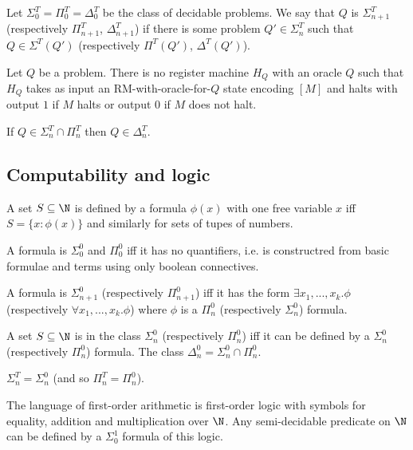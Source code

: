 \documentclass{article}
\begin{document}
\begin{definition}
    Let $\Sigma_0^T=\Pi^T_0=\Delta^T_0$ be the class of decidable problems. We say 
    that $Q$ is $\Sigma_{n+1}^T$ (respectively $\Pi_{n+1}^T$, $\Delta_{n+1}^T$)
    if there is some problem $Q'\in\Sigma_n^T$ such that $Q\in\Sigma^T(Q')$
    (respectively $\Pi^T(Q')$, $\Delta^T(Q')$).
\end{definition}

\begin{definition}
    Let $Q$ be a problem. There is no register machine $H_Q$ with an oracle $Q$ 
    such that $H_Q$ takes as input an RM-with-oracle-for-$Q$ state encoding 
    $[M]$ and halts with output $1$ if $M$ halts or output $0$ if $M$ does not halt.
\end{definition}

\begin{theorem}
    If $Q\in\Sigma_n^T\cap\Pi_n^T$ then $Q\in\Delta^T_n$.
\end{theorem}

\subsection{Computability and logic}

\begin{definition}
    A set $S\subseteq\N$ is defined by a formula $\phi(x)$ with one free variable
    $x$ iff $S=\{x:\phi(x)\}$ and similarly for sets of tupes of numbers.
\end{definition}

\begin{definition}
    A formula is $\Sigma_0^0$ and $\Pi_0^0$ iff it has no quantifiers, i.e. is 
    constructred from basic formulae and terms using only boolean connectives.

    A formula is $\Sigma_{n+1}^0$ (respectively $\Pi_{n+1}^0$) iff it has the form 
    $\exists x_1,...,x_k.\phi$ (respectively $\forall x_1,...,x_k.\phi$) where
    $\phi$ is a $\Pi_n^0$ (respectively $\Sigma_n^0$) formula.
\end{definition}

\begin{definition}
    A set $S\subseteq\N$ is in the class $\Sigma_n^0$ (respectively $\Pi_n^0$)
    iff it can be defined by a $\Sigma_n^0$ (respectively $\Pi_n^0$)
    formula. The class $\Delta_n^0 = \Sigma_n^0\cap\Pi_n^0$.
\end{definition}

\begin{theorem}[Notes I.40]
    $\Sigma_n^T=\Sigma_n^0$ (and so $\Pi_n^T=\Pi_n^0$). 
\end{theorem}

\begin{theorem}
    The language of first-order arithmetic is first-order logic with symbols for 
    equality, addition and multiplication over $\N$. Any semi-decidable predicate on
    $\N$ can be defined by a $\Sigma_0^1$ formula of this logic.
\end{theorem}
\end{document}
